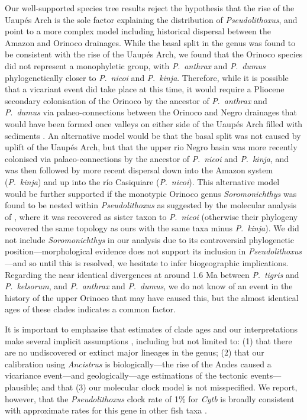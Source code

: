 \documentclass[12pt]{article}
\begin{document}
Our well-supported species tree results reject the hypothesis that the rise of the Uaupés Arch is the sole factor explaining the distribution of \emph{Pseudolithoxus}, and point to a more complex model including historical dispersal between the Amazon and Orinoco drainages. %
While the basal split in the genus was found to be consistent with the rise of the Uaupés Arch, we found that the Orinoco species did not represent a monophyletic group, with \emph{P}.\ \emph{anthrax} and \emph{P}.\ \emph{dumus} phylogenetically closer to \emph{P}.\ \emph{nicoi} and \emph{P}.\ \emph{kinja}. %
Therefore, while it is possible that a vicariant event did take place at this time, it would require a Pliocene secondary colonisation of the Orinoco by the ancestor of \emph{P}.\ \emph{anthrax} and \emph{P}.\ \emph{dumus} via palaeo-connections between the Orinoco and Negro drainages that would have been formed once valleys on either side of the Uaupés Arch filled with sediments \citep{Winemiller2011}. %
An alternative model would be that the basal split was not caused by uplift of the Uaupés Arch, but that the upper rio Negro basin was more recently colonised via palaeo-connections by the ancestor of \emph{P}.\ \emph{nicoi} and \emph{P}.\ \emph{kinja}, and was then followed by more recent dispersal down into the Amazon system (\emph{P}.\ \emph{kinja}) and up into the río Casiquiare (\emph{P}.\ \emph{nicoi}). %
This alternative model would be further supported if the monotypic Orinoco genus \emph{Soromonichthys} was found to be nested within \emph{Pseudolithoxus} as suggested by the molecular analysis of \citet{Lujan2015phylo}, where it was recovered as sister taxon to \emph{P}.\ \emph{nicoi} (otherwise their phylogeny recovered the same topology as ours with the same taxa minus \emph{P}.\ \emph{kinja}). %
We did not include \emph{Soromonichthys} in our analysis due to its controversial phylogenetic position---morphological evidence does not support its inclusion in \emph{Pseudolithoxus}---and so until this is resolved, we hesitate to infer biogeographic implications. %
Regarding the near identical divergences at around 1.6 Ma between \emph{P}.\ \emph{tigris} and \emph{P}.\ \emph{kelsorum}, and \emph{P}.\ \emph{anthrax} and \emph{P}.\ \emph{dumus}, we do not know of an event in the history of the upper Orinoco that may have caused this, but the almost identical ages of these clades indicates a common factor.%

It is important to emphasise that estimates of clade ages and our interpretations make several implicit assumptions \citep[e.g.][]{Duchene2014,Ho2014,Lovejoy2010}, including but not limited to: (1) that there are no undiscovered or extinct major lineages in the genus; (2) that our calibration using \emph{Ancistrus} is biologically---the rise of the Andes caused a vicariance event---and geologically---age estimations of the tectonic events---plausible; and that (3) our molecular clock model is not misspecified. %
We report, however, that the \emph{Pseudolithoxus} clock rate of 1\% for \emph{Cytb} is broadly consistent with approximate rates for this gene in other fish taxa \citep[e.g.\ 0.74-0.92\%;][]{Ruber2004}.%
\end{document}

